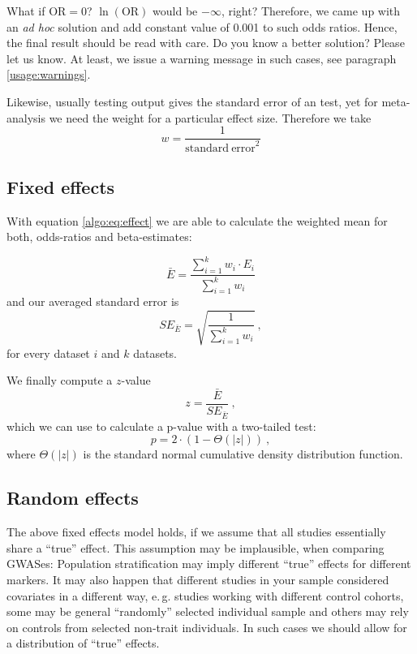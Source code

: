 \alert{What if $\mathrm{OR} = 0$? $\ln{(\mathrm{OR})}$ would be $-\infty$, right? Therefore, we came up with an \textit{ad hoc} solution and add constant value of 0.001 to such odds ratios. Hence, the final result should be read with care. Do you know a better solution? Please let us know. At least, we issue a warning message in such cases, see paragraph \ref{usage:warnings}.}

Likewise, usually testing output gives the standard error of an test, yet for meta-analysis we need the weight for a particular effect size. Therefore we take
\begin{equation}
 \label{algo:eq:wheight}
 w = \frac{1}{\mathrm{standard~error}^2}
\end{equation}

\subsection{Fixed effects}

With equation \ref{algo:eq:effect} we are able to calculate the weighted mean for both, odds-ratios and beta-estimates:

\begin{equation}
 \label{algo:eq:wheighted_mean}
 \bar{E} = \dfrac{\sum_{i=1}^{k} w_i \cdot E_i}{\sum_{i=1}^{k} w_i}
\end{equation}
and our averaged standard error is
\begin{equation}
 \label{algo:eq:averaged_se}
 SE_{\bar{E}} = \sqrt{\dfrac{1}{\sum_{i=1}^{k} w_i}}~,
\end{equation}
for every dataset $i$ and $k$ datasets.

We finally compute a $z$-value
\begin{equation}
 z = \dfrac{\bar{E}}{SE_{\bar{E}}}~,
\end{equation}
which we can use to calculate a p-value with a two-tailed test:
\begin{equation}
\label{algo:equ:p}
 p = 2 \cdot \left(1 - \Theta(| z |) \right)~,
\end{equation}
where $\Theta(| z |)$ is the standard normal cumulative density distribution function.

\subsection{Random effects}

The above fixed effects model holds, if we assume that all studies essentially share a ``true'' effect. This assumption may be implausible, when comparing GWASes: Population stratification may imply different ``true'' effects for different markers. It may also happen that different studies in your sample considered covariates in a different way, e.\,g. studies working with different control cohorts, some may be general ``randomly'' selected individual sample and others may rely on controls from selected non-trait individuals. In such cases we should allow for a distribution of ``true'' effects.

